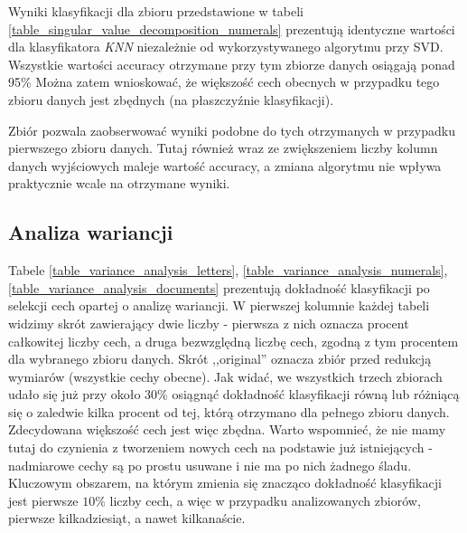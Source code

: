 \documentclass{classrep}
\begin{document}
{{            Wyniki klasyfikacji dla zbioru \cite{dataset_numerals} przedstawione w
            tabeli \ref{table_singular_value_decomposition_numerals} prezentują
            identyczne wartości dla klasyfikatora \textit{KNN} niezależnie od
            wykorzystywanego algorytmu przy SVD. Wszystkie wartości accuracy otrzymane
            przy tym zbiorze danych osiągają ponad 95\% Można zatem wnioskować, że
            większość cech obecnych w przypadku tego zbioru danych jest zbędnych (na
            płaszczyźnie klasyfikacji).

            Zbiór \cite{dataset_documents} pozwala zaobserwować wyniki podobne do tych
            otrzymanych w przypadku pierwszego zbioru danych. Tutaj również wraz ze
            zwiększeniem liczby kolumn danych wyjściowych maleje wartość accuracy, a
            zmiana algorytmu nie wpływa praktycznie wcale na otrzymane wyniki.
        }

        \subsection{Analiza wariancji} {
            Tabele \ref{table_variance_analysis_letters},
            \ref{table_variance_analysis_numerals},
            \ref{table_variance_analysis_documents} prezentują dokładność klasyfikacji
            po selekcji cech opartej o analizę wariancji. W pierwszej kolumnie każdej
            tabeli widzimy skrót zawierający dwie liczby - pierwsza z nich oznacza
            procent całkowitej liczby cech, a druga bezwzględną liczbę cech, zgodną z
            tym procentem dla wybranego zbioru danych. Skrót ,,original'' oznacza zbiór
            przed redukcją wymiarów (wszystkie cechy obecne). Jak widać, we wszystkich
            trzech zbiorach udało się już przy około $30\%$ osiągnąć dokładność
            klasyfikacji równą lub różniącą się o zaledwie kilka procent od tej, którą
            otrzymano dla pełnego zbioru danych. Zdecydowana większość cech jest więc
            zbędna. Warto wspomnieć, że nie mamy tutaj do czynienia z tworzeniem nowych
            cech na podstawie już istniejących - nadmiarowe cechy są po prostu usuwane
            i nie ma po nich żadnego śladu. Kluczowym obszarem, na którym zmienia się
            znacząco dokładność klasyfikacji jest pierwsze $10\%$ liczby cech, a więc w
            przypadku analizowanych zbiorów, pierwsze kilkadziesiąt, a nawet kilkanaście.

}}
\end{document}
